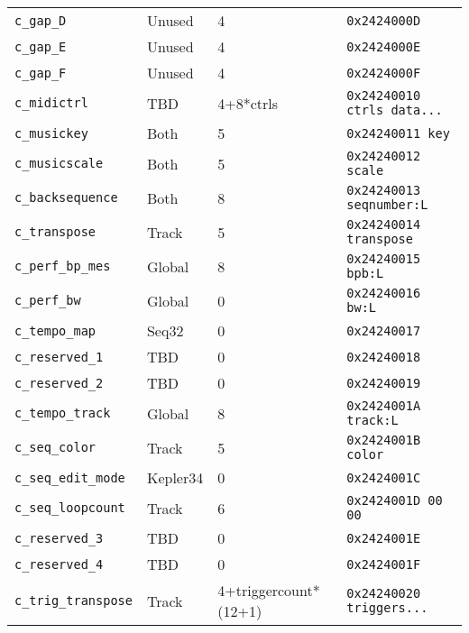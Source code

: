 \begin{table}[htb]
\begin{tabular}{l l l l}
         \texttt{c\_gap\_D}          & Unused        & 4                 & \texttt{0x2424000D} \\
         \texttt{c\_gap\_E}          & Unused        & 4                 & \texttt{0x2424000E} \\
         \texttt{c\_gap\_F}          & Unused        & 4                 & \texttt{0x2424000F} \\
         \texttt{c\_midictrl}        & TBD           & 4+8*ctrls         & \texttt{0x24240010 ctrls data...} \\
         \texttt{c\_musickey}        & Both          & 5                 & \texttt{0x24240011 key} \\
         \texttt{c\_musicscale}      & Both          & 5                 & \texttt{0x24240012 scale} \\
         \texttt{c\_backsequence}    & Both          & 8                 & \texttt{0x24240013 seqnumber:L} \\
         \texttt{c\_transpose}       & Track         & 5                 & \texttt{0x24240014 transpose} \\
         \texttt{c\_perf\_bp\_mes}   & Global        & 8                 & \texttt{0x24240015 bpb:L} \\
         \texttt{c\_perf\_bw}        & Global        & 0                 & \texttt{0x24240016 bw:L} \\
         \texttt{c\_tempo\_map}      & Seq32         & 0                 & \texttt{0x24240017} \\
         \texttt{c\_reserved\_1}     & TBD           & 0                 & \texttt{0x24240018} \\
         \texttt{c\_reserved\_2}     & TBD           & 0                 & \texttt{0x24240019} \\
         \texttt{c\_tempo\_track}    & Global        & 8                 & \texttt{0x2424001A track:L} \\
         \texttt{c\_seq\_color}      & Track         & 5                 & \texttt{0x2424001B color} \\
         \texttt{c\_seq\_edit\_mode} & Kepler34      & 0                 & \texttt{0x2424001C} \\
         \texttt{c\_seq\_loopcount}  & Track         & 6                 & \texttt{0x2424001D 00 00} \\
         \texttt{c\_reserved\_3}     & TBD           & 0                 & \texttt{0x2424001E} \\
         \texttt{c\_reserved\_4}     & TBD           & 0                 & \texttt{0x2424001F} \\
         \texttt{c\_trig\_transpose} & Track     & 4+triggercount*(12+1) & \texttt{0x24240020 triggers...} \\
      \end{tabular}
   \end{table}


